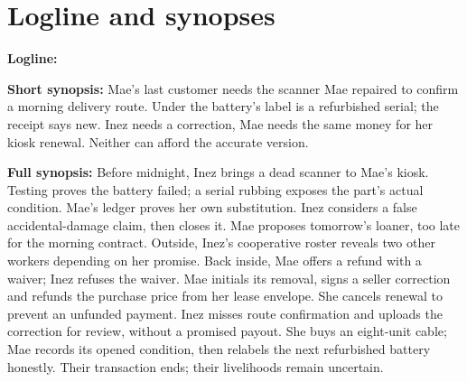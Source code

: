 \section{Logline and synopses}
\textbf{Logline:} \filmlogline

\textbf{Short synopsis:} Mae's last customer needs the scanner Mae repaired to confirm a morning delivery route. Under the battery's label is a refurbished serial; the receipt says new. Inez needs a correction, Mae needs the same money for her kiosk renewal. Neither can afford the accurate version.

\textbf{Full synopsis:} Before midnight, Inez brings a dead scanner to Mae's kiosk. Testing proves the battery failed; a serial rubbing exposes the part's actual condition. Mae's ledger proves her own substitution. Inez considers a false accidental-damage claim, then closes it. Mae proposes tomorrow's loaner, too late for the morning contract. Outside, Inez's cooperative roster reveals two other workers depending on her promise. Back inside, Mae offers a refund with a waiver; Inez refuses the waiver. Mae initials its removal, signs a seller correction and refunds the purchase price from her lease envelope. She cancels renewal to prevent an unfunded payment. Inez misses route confirmation and uploads the correction for review, without a promised payout. She buys an eight-unit cable; Mae records its opened condition, then relabels the next refurbished battery honestly. Their transaction ends; their livelihoods remain uncertain.

